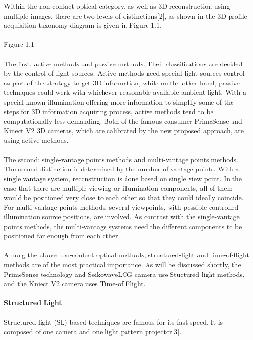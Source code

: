  Within the non-contact optical category, as well as 3D reconstruction using multiple images, there are two levels of distinctions[2],
 as shown in the 3D profile acquisition taxonomy diagram is given in Figure 1.1.%
 \\\\Figure 1.1
\\\\The first: active methods and passive methods. Their classifications are decided by the control of light sources. Active methods need special light sources control as part of the strategy to get 3D information, while on the other hand, passive techniques could work with whichever reasonable available ambient light. With a special known illumination offering more information to simplify some of the steps for 3D information acquiring process, active methods tend to be computationally less demanding. Both of the famous consumer PrimeSense and Kinect V2 3D cameras, which are calibrated by the new proposed approach, are using active methods.
\\\\The second: single-vantage points methods and multi-vantage points methods. The second distinction is determined by the number of vantage points. With a single vantage system, reconstruction is done based on single view point. In the case that there are multiple viewing or illumination components, all of them would be positioned very close to each other so that they could ideally coincide. For multi-vantage points methods, several viewpoints, with possible controlled illumination source positions, are involved. As contrast with the single-vantage points methods, the multi-vantage systems need the different components to be positioned far enough from each other. 
\\ \\
Among the above non-contact optical methods, structured-light and time-of-flight methods are of the most practical importance.
As will be discussed shortly, the PrimeSense technology and SeikowaveLCG camera use Stuctured light methods, and the Kniect V2 camera uses Time-of Flight. 
\\
\\\textbf{Structured Light}\\\\
Structured light (SL) based techniques are famous for its fast speed. It is composed of one camera and one light pattern projector[3]. %
